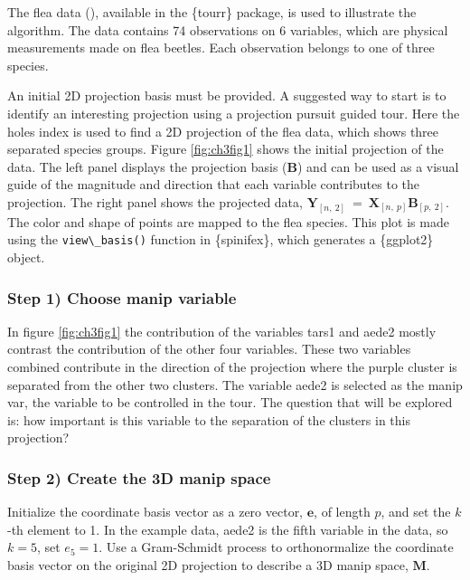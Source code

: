 \documentclass{template/monashthesis}
\begin{document}
The flea data (\textcite{lubischew_use_1962}), available in the \{tourr\} package, is used to illustrate the algorithm. The data contains 74 observations on 6 variables, which are physical measurements made on flea beetles. Each observation belongs to one of three species.

An initial 2D projection basis must be provided. A suggested way to start is to identify an interesting projection using a projection pursuit guided tour. Here the holes index is used to find a 2D projection of the flea data, which shows three separated species groups. Figure \ref{fig:ch3fig1} shows the initial projection of the data. The left panel displays the projection basis (\(\textbf{B}\)) and can be used as a visual guide of the magnitude and direction that each variable contributes to the projection. The right panel shows the projected data, \(\textbf{Y}_{[n,~2]} ~=~ \textbf{X}_{[n,~p]} \textbf{B}_{[p,~2]}\). The color and shape of points are mapped to the flea species. This plot is made using the \texttt{view\textbackslash{}\_basis()} function in \{spinifex\}, which generates a \{ggplot2\} \autocite{wickham_ggplot2_2016} object.

\hypertarget{step-1-choose-manip-variable}{%
\subsubsection{Step 1) Choose manip variable}\label{step-1-choose-manip-variable}}

In figure \ref{fig:ch3fig1} the contribution of the variables tars1 and aede2 mostly contrast the contribution of the other four variables. These two variables combined contribute in the direction of the projection where the purple cluster is separated from the other two clusters. The variable aede2 is selected as the manip var, the variable to be controlled in the tour. The question that will be explored is: how important is this variable to the separation of the clusters in this projection?

\hypertarget{step-2-create-the-3d-manip-space}{%
\subsubsection{Step 2) Create the 3D manip space}\label{step-2-create-the-3d-manip-space}}

Initialize the coordinate basis vector as a zero vector, \(\textbf{e}\), of length \(p\), and set the \(k\)-th element to 1. In the example data, aede2 is the fifth variable in the data, so \(k=5\), set \(e_5=1\). Use a Gram-Schmidt process to orthonormalize the coordinate basis vector on the original 2D projection to describe a 3D manip space, \(\textbf{M}\).
\end{document}
